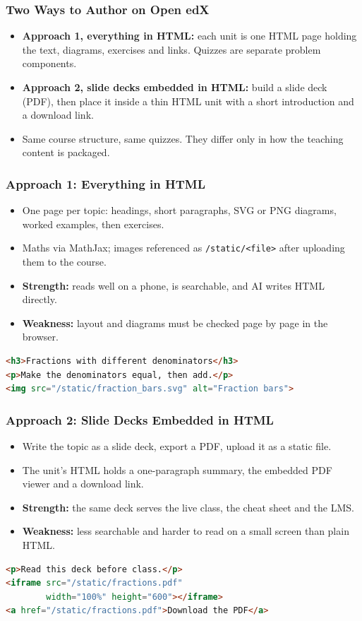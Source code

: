 \begin{frame}[fragile]\frametitle{Two Ways to Author on Open edX}
\begin{itemize}
\item \textbf{Approach 1, everything in HTML:} each unit is one HTML page holding the text, diagrams, exercises and links. Quizzes are separate problem components.
\item \textbf{Approach 2, slide decks embedded in HTML:} build a slide deck (PDF), then place it inside a thin HTML unit with a short introduction and a download link.
\item Same course structure, same quizzes. They differ only in how the teaching content is packaged.
\end{itemize}
\end{frame}

\begin{frame}[fragile]\frametitle{Approach 1: Everything in HTML}
\begin{itemize}
\item One page per topic: headings, short paragraphs, SVG or PNG diagrams, worked examples, then exercises.
\item Maths via MathJax; images referenced as \texttt{/static/<file>} after uploading them to the course.
\item \textbf{Strength:} reads well on a phone, is searchable, and AI writes HTML directly.
\item \textbf{Weakness:} layout and diagrams must be checked page by page in the browser.
\end{itemize}
\begin{lstlisting}[language=HTML]
<h3>Fractions with different denominators</h3>
<p>Make the denominators equal, then add.</p>
<img src="/static/fraction_bars.svg" alt="Fraction bars">
\end{lstlisting}
\end{frame}

\begin{frame}[fragile]\frametitle{Approach 2: Slide Decks Embedded in HTML}
\begin{itemize}
\item Write the topic as a slide deck, export a PDF, upload it as a static file.
\item The unit's HTML holds a one-paragraph summary, the embedded PDF viewer and a download link.
\item \textbf{Strength:} the same deck serves the live class, the cheat sheet and the LMS.
\item \textbf{Weakness:} less searchable and harder to read on a small screen than plain HTML.
\end{itemize}
\begin{lstlisting}[language=HTML]
<p>Read this deck before class.</p>
<iframe src="/static/fractions.pdf"
        width="100%" height="600"></iframe>
<a href="/static/fractions.pdf">Download the PDF</a>
\end{lstlisting}
\end{frame}

